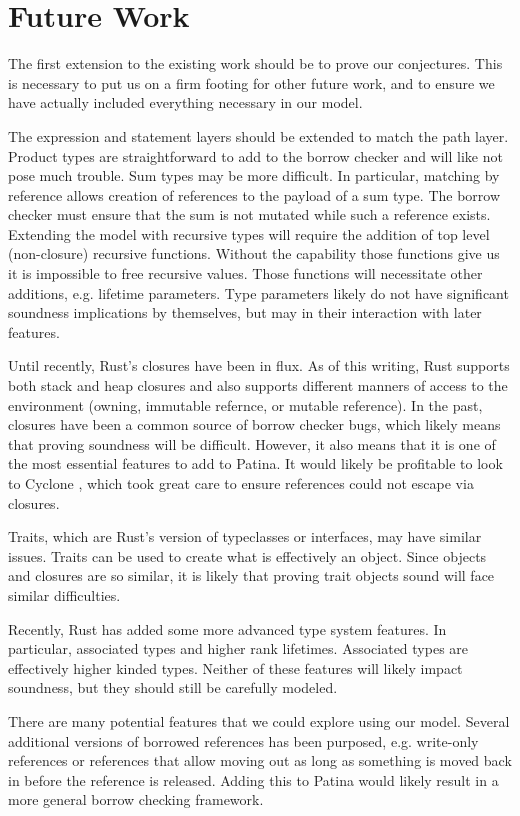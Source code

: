 \section*{Future Work}
The first extension to the existing work should be to prove our conjectures.
This is necessary to put us on a firm footing for other future work, and
to ensure we have actually included everything necessary in our model.

The expression and statement layers should be extended to match the path layer.
Product types are straightforward to add to the borrow checker and will like not
pose much trouble. Sum types may be more difficult. In particular, matching by
reference allows creation of references to the payload of a sum type.
The borrow checker must ensure that the sum is not mutated while such a reference
exists. Extending the model with recursive types will require the addition of
top level (non-closure) recursive functions. Without the capability those functions
give us it is impossible to free recursive values. Those functions will necessitate
other additions, e.g. lifetime parameters. Type parameters likely do not have
significant soundness implications by themselves, but may in their interaction with
later features.

Until recently, Rust's closures have been in flux. As of this writing, Rust supports
both stack and heap closures and also supports different manners of access to the environment
(owning, immutable refernce, or mutable reference). In the past, closures have been a
common source of borrow checker bugs, which likely means that proving soundness will be
difficult. However, it also means that it is one of the most essential features to add to Patina.
It would likely be profitable to look to Cyclone \cite{cycregions}, which took great
care to ensure references could not escape via closures.

Traits, which are Rust's version of typeclasses or interfaces, may have similar issues.
Traits can be used to create what is effectively an object.
Since objects and closures are so similar, it is likely that proving trait objects sound
will face similar difficulties.

Recently, Rust has added some more advanced type system features.
In particular, associated types and higher rank lifetimes.
Associated types are effectively higher kinded types.
Neither of these features will likely impact soundness, but they should still be
carefully modeled.

There are many potential features that we could explore using our model.
Several additional versions of borrowed references has been purposed,
e.g. write-only references or references that allow moving out as long as something
is moved back in before the reference is released. Adding this to Patina would likely
result in a more general borrow checking framework.

